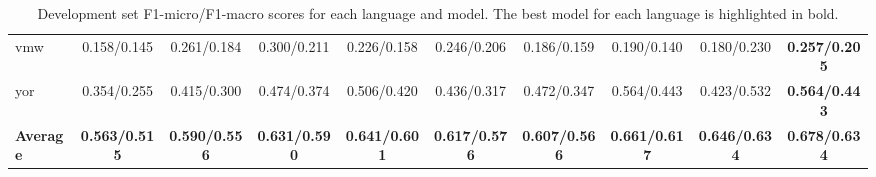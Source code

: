 \documentclass[a4paper,12pt]{extarticle}
\begin{document}
\begin{table}[!th]
\begin{center}
{\begin{tabular}{@{}lccccccccc@{}}
    vmw & 0.158/0.145 & 0.261/0.184 & 0.300/0.211 & 0.226/0.158 & 0.246/0.206 & 0.186/0.159 & 0.190/0.140 & 0.180/0.230 & \textbf{0.257/0.205} \\
    yor & 0.354/0.255 & 0.415/0.300 & 0.474/0.374 & 0.506/0.420 & 0.436/0.317 & 0.472/0.347 & 0.564/0.443 & 0.423/0.532 & \textbf{0.564/0.443} \\ \midrule
    \textbf{Average} & \textbf{0.563/0.515} & \textbf{0.590/0.556} & \textbf{0.631/0.590} & \textbf{0.641/0.601} & \textbf{0.617/0.576} & \textbf{0.607/0.566} & \textbf{0.661/0.617} & \textbf{0.646/0.634} & \textbf{0.678/0.634} \\ \bottomrule
    \end{tabular}
    }
\end{center}
\caption{Development set F1-micro/F1-macro scores for each language and model. The best model for each language is highlighted in bold.}
\label{tab:multilingual_performance}
\end{table}
\end{document}
